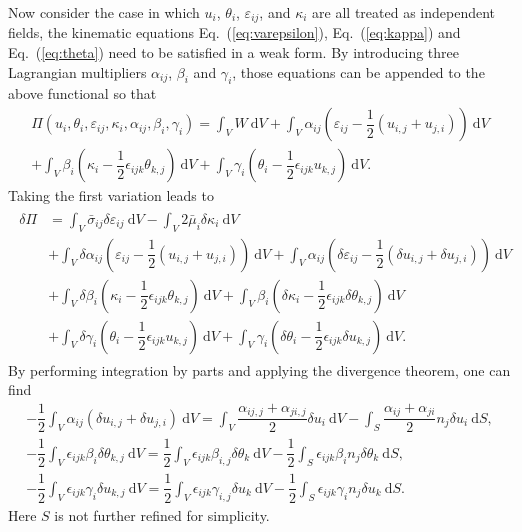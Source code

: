 \documentclass[3p,sort&compress,11pt,fleqn]{elsarticle}
\newcommand*{\eqsref}[1]{Eq.~(\ref{#1})}
\newcommand*{\md}[1]{\mathrm{d}#1}
\begin{document}
Now consider the case in which $u_i$, $\theta_i$, $\varepsilon_{ij}$, and $\kappa_i$ are all treated as independent fields, the kinematic equations \eqsref{eq:varepsilon}, \eqsref{eq:kappa} and \eqsref{eq:theta} need to be satisfied in a weak form. By introducing three Lagrangian multipliers $\alpha_{ij}$, $\beta_i$ and $\gamma_i$, those equations can be appended to the above functional so that
\begin{multline}
\varPi\left(u_i,\theta_i,\varepsilon_{ij},\kappa_i,\alpha_{ij},\beta_i,\gamma_i\right)=\int_VW~\md{V}
+\int_V\alpha_{ij}\left(\varepsilon_{ij}-\dfrac{1}{2}\left(u_{i,j}+u_{j,i}\right)\right)~\md{V}\\
+\int_V\beta_i\left(\kappa_i-\dfrac{1}{2}\epsilon_{ijk}\theta_{k,j}\right)~\md{V}
+\int_V\gamma_i\left(\theta_i-\dfrac{1}{2}\epsilon_{ijk}u_{k,j}\right)~\md{V}.
\end{multline}
Taking the first variation leads to
\begin{gather}\label{eq:variation}
\begin{split}
\delta\varPi&=
\int_V\bar{\sigma}_{ij}\delta\varepsilon_{ij}~\md{V}
-\int_V2\bar{\mu}_{i}\delta\kappa_i~\md{V}\\&
+\int_V\delta{}\alpha_{ij}\left(\varepsilon_{ij}-\dfrac{1}{2}\left(u_{i,j}+u_{j,i}\right)\right)~\md{V}
+\int_V\alpha_{ij}\left(\delta{}\varepsilon_{ij}-\dfrac{1}{2}\left(\delta{}u_{i,j}+\delta{}u_{j,i}\right)\right)~\md{V}\\&
+\int_V\delta{}\beta_i\left(\kappa_i-\dfrac{1}{2}\epsilon_{ijk}\theta_{k,j}\right)~\md{V}
+\int_V\beta_i\left(\delta{}\kappa_i-\dfrac{1}{2}\epsilon_{ijk}\delta{}\theta_{k,j}\right)~\md{V}\\&
+\int_V\delta{}\gamma_i\left(\theta_i-\dfrac{1}{2}\epsilon_{ijk}u_{k,j}\right)~\md{V}
+\int_V\gamma_i\left(\delta{}\theta_i-\dfrac{1}{2}\epsilon_{ijk}\delta{}u_{k,j}\right)~\md{V}.
\end{split}
\end{gather}
By performing integration by parts and applying the divergence theorem, one can find
\begin{gather}
-\dfrac{1}{2}\int_V\alpha_{ij}\left(\delta{}u_{i,j}+\delta{}u_{j,i}\right)~\md{V}=\int_V\dfrac{\alpha_{ij,j}+\alpha_{ji,j}}{2}\delta{}u_i~\md{V}-\int_S\dfrac{\alpha_{ij}+\alpha_{ji}}{2}n_j\delta{}u_i~\md{S},\\
-\dfrac{1}{2}\int_V\epsilon_{ijk}\beta_i\delta\theta_{k,j}~\md{V}=\dfrac{1}{2}\int_V\epsilon_{ijk}\beta_{i,j}\delta\theta_k~\md{V}-\dfrac{1}{2}\int_S\epsilon_{ijk}\beta_in_j\delta\theta_k~\md{S},\\
-\dfrac{1}{2}\int_V\epsilon_{ijk}\gamma_i\delta{}u_{k,j}~\md{V}=\dfrac{1}{2}\int_V\epsilon_{ijk}\gamma_{i,j}\delta{}u_k~\md{V}-\dfrac{1}{2}\int_S\epsilon_{ijk}\gamma_in_j\delta{}u_k~\md{S}.
\end{gather}
Here $S$ is not further refined for simplicity.
\end{document}

